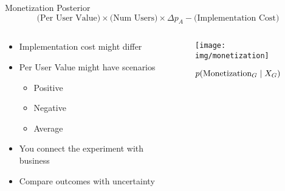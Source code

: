 \documentclass{beamer}
\begin{document}
\begin{frame}{Monetization Posterior}
\begin{equation*}\text{(Per User Value)} \times \text{(Num Users)} \times \Delta p_A - \text{(Implementation Cost)} 
    \end{equation*}
    \begin{columns}
    \begin{column}{0.4\linewidth}
    \begin{itemize}
        \item Implementation cost might differ
        \item Per User Value might have scenarios
        \begin{itemize}
            \item Positive
            \item Negative
            \item Average
        \end{itemize}
        \item You connect the experiment with business
        \item Compare outcomes with uncertainty
    \end{itemize}
    \end{column}
    \begin{column}{0.6\linewidth}
    \begin{figure}
        \centering
        \texttt{[image: img/monetization]}
        \caption{$p(\text{Monetization}_G\;|\; X_G)$}
    \end{figure}
    \end{column}
    \end{columns}
\end{frame}
\end{document}
